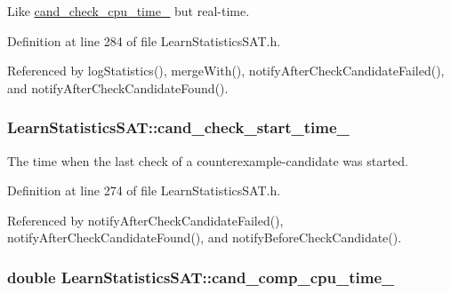 Like \hyperlink{classLearnStatisticsSAT_a2ab5cd522b7a4d700a11c0bb430baa81}{cand\-\_\-check\-\_\-cpu\-\_\-time\-\_\-} but real-\/time. 



Definition at line 284 of file Learn\-Statistics\-S\-A\-T.\-h.



Referenced by log\-Statistics(), merge\-With(), notify\-After\-Check\-Candidate\-Failed(), and notify\-After\-Check\-Candidate\-Found().

\hypertarget{classLearnStatisticsSAT_a1effa4c15e4349fb1e6f62ad6c79d6c5}{
\subsubsection[{cand\-\_\-check\-\_\-start\-\_\-time\-\_\-}]{ Learn\-Statistics\-S\-A\-T\-::cand\-\_\-check\-\_\-start\-\_\-time\-\_\-\hspace{0.3cm}{\ttfamily [protected]}}}\label{classLearnStatisticsSAT_a1effa4c15e4349fb1e6f62ad6c79d6c5}


The time when the last check of a counterexample-\/candidate was started. 



Definition at line 274 of file Learn\-Statistics\-S\-A\-T.\-h.



Referenced by notify\-After\-Check\-Candidate\-Failed(), notify\-After\-Check\-Candidate\-Found(), and notify\-Before\-Check\-Candidate().

\hypertarget{classLearnStatisticsSAT_af977c00fbf0f9978f92dd5c997577a06}{
\subsubsection[{cand\-\_\-comp\-\_\-cpu\-\_\-time\-\_\-}]{\setlength{\rightskip}{0pt plus 5cm}double Learn\-Statistics\-S\-A\-T\-::cand\-\_\-comp\-\_\-cpu\-\_\-time\-\_\-\hspace{0.3cm}{\ttfamily [protected]}}}\label{classLearnStatisticsSAT_af977c00fbf0f9978f92dd5c997577a06}


